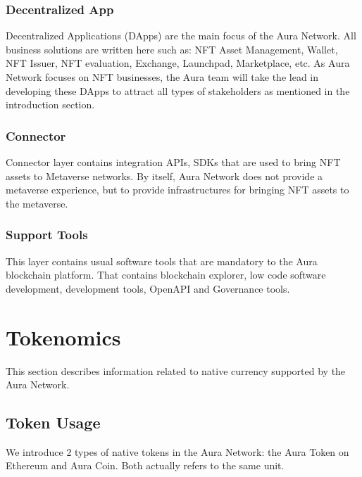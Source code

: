\documentclass[12pt]{article}
\begin{document}
\subsubsection*{Decentralized App}
Decentralized Applications (DApps) are the main focus of the Aura Network. All business solutions are written here such as: NFT Asset Management, Wallet, NFT Issuer, NFT evaluation, Exchange, Launchpad, Marketplace, etc. As Aura Network focuses on NFT businesses, the Aura team will take the lead in developing these DApps to attract all types of stakeholders as mentioned in the introduction section.

\subsubsection*{Connector}
Connector layer contains integration APIs, SDKs that are used to bring NFT assets to Metaverse networks. By itself, Aura Network does not provide a metaverse experience, but to provide infrastructures for bringing NFT assets to the metaverse.

\subsubsection*{Support Tools}
This layer contains usual software tools that are mandatory to the Aura blockchain platform. That contains blockchain explorer, low code software development, development tools, OpenAPI and Governance tools.

\section{Tokenomics}

This section describes information related to native currency supported by the Aura Network.

\subsection{Token Usage}
We introduce 2 types of native tokens in the Aura Network: the Aura Token on Ethereum and Aura Coin. Both actually refers to the same unit.
\end{document}
